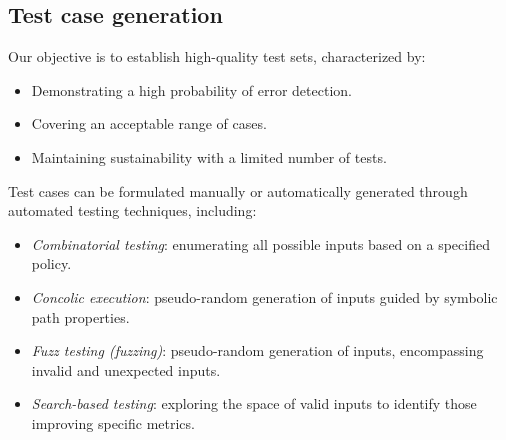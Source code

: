 \subsection{Test case generation}
Our objective is to establish high-quality test sets, characterized by:
\begin{itemize}
    \item Demonstrating a high probability of error detection.
    \item Covering an acceptable range of cases.
    \item Maintaining sustainability with a limited number of tests.
\end{itemize}
Test cases can be formulated manually or automatically generated through automated testing techniques, including:
\begin{itemize}
    \item \textit{Combinatorial testing}: enumerating all possible inputs based on a specified policy.
    \item \textit{Concolic execution}: pseudo-random generation of inputs guided by symbolic path properties.
    \item \textit{Fuzz testing (fuzzing)}: pseudo-random generation of inputs, encompassing invalid and unexpected inputs.
    \item \textit{Search-based testing}: exploring the space of valid inputs to identify those improving specific metrics.
\end{itemize}

